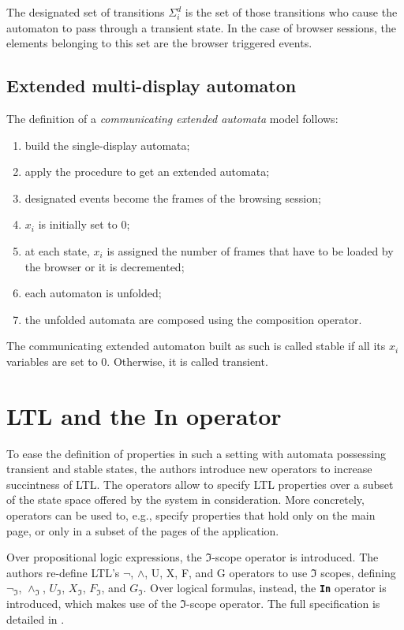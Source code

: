 \documentclass[a4paper,10pt]{article}
\theoremstyle{plain} %
\theoremstyle{definition}
\theoremstyle{remark}
\begin{document}
The designated set of transitions $\Sigma^d_i$ is the set of those transitions who cause the automaton to pass through a transient state. In the case of browser sessions, the elements belonging to this set are the browser triggered events.

\subsection{Extended multi-display automaton}

The definition of a \textit{communicating extended automata} model follows:

\begin{enumerate}
  \item build the single-display automata;
  \item apply the procedure to get an extended automata;
  \item designated events become the frames of the browsing session;
  \item $x_i$ is initially set to 0;
  \item at each state, $x_i$ is assigned the number of frames that have to be loaded by the browser or it is decremented;
  \item each automaton is unfolded;
  \item the unfolded automata are composed using the composition operator.
\end{enumerate}

The communicating extended automaton built as such is called stable if all its $x_i$ variables are set to 0. Otherwise, it is called transient.

\section{LTL and the In operator}

To ease the definition of properties in such a setting with automata possessing transient and stable states, the authors introduce new operators to increase succintness of LTL. The operators allow to specify LTL properties over a subset of the state space offered by the system in consideration. More concretely, operators can be used to, e.g., specify properties that hold only on the main page, or only in a subset of the pages of the application.

Over propositional logic expressions, the $\mathcal{\Im}$-scope operator is introduced. The authors re-define LTL's $\neg$, $\land$, U, X, F, and G operators to use $\mathcal{\Im}$ scopes, defining $\neg_{\mathcal{\Im}}$, $\land_{\mathcal{\Im}}$, $U_{\mathcal{\Im}}$, $X_{\mathcal{\Im}}$, $F_{\mathcal{\Im}}$, and $G_{\mathcal{\Im}}$.  Over logical formulas, instead, the \textbf{\texttt{In}} operator is introduced, which makes use of the $\mathcal{\Im}$-scope operator. The full specification is detailed in \cite{Haydar2005}.
\end{document}

